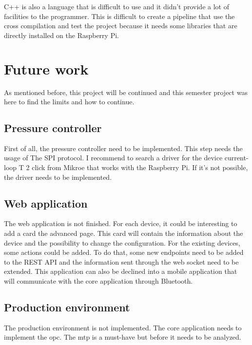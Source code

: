 C++ is also a language that is difficult to use and it didn't provide a lot of facilities to the programmer.
This is difficult to create a pipeline that use the cross compilation and test the project because it needs some libraries that are directly installed on the Raspberry Pi.


\section{Future work}
\label{ch:conclusion:future}

As mentioned before, this project will be continued and this semester project was here to find the limits and how to continue.

\subsection{Pressure controller}
\label{ch:conclusion:future:pressure_controller}

First of all, the pressure controller need to be implemented.
This step needs the usage of The SPI protocol.
I recommend to search a driver for the device current-loop T 2 click from Mikroe that works with the Raspberry Pi.
If it's not possible, the driver needs to be implemented.


\subsection{Web application}
\label{ch:conclusion:future:web_application}

The web application is not finished.
For each device, it could be interesting to add a card the advanced page.
This card will contain the information about the device and the possibility to change the configuration.
For the existing devices, some actions could be added.
To do that, some new endpoints need to be added to the REST API and the information sent through the web socket need to be extended.
This application can also be declined into a mobile application that will communicate with the core application through Bluetooth.


\subsection{Production environment}
\label{ch:conclusion:future:production_environment}

The production environment is not implemented.
The core application needs to implement the \acrfull{opc}.
The \acrfull{mtp} is a must-have but before it needs to be analyzed.


